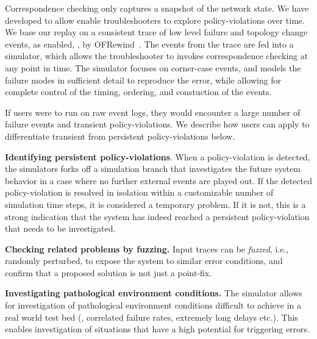 
Correspondence checking only captures a snapshot of the network state.
We have developed \simulator{} to allow enable troubleshooters to explore
policy-violations over time. We base our replay on a consistent
trace of low level failure and topology change events, as enabled,
\eg{}, by OFRewind~\cite{ofrewind}. The
events from the trace are fed into a simulator, which allows the
troubleshooter to invokes correspondence
checking at any point in time. The simulator focuses on corner-case events,
and models the failure modes in sufficient detail to reproduce the error, while
allowing for complete control of the timing, ordering, and constuction of the events.


If users were to run \simulator{} on raw event logs, they would encounter a
large number of failure events and transient policy-violations. We describe
how users can apply \simulator{} to differentiate transient from persistent
policy-violations below.

\textbf{Identifying persistent policy-violations}. When a policy-violation is detected,
the simulators forks off a simulation branch that investigates the future system behavior
in a case where no further external events are played out. If the detected
policy-violation
is resolved in isolation within a customizable number of simulation time steps, it is considered
a temporary problem. If it is not, this is a strong indication that the system has indeed
reached a persistent policy-violation that needs to be investigated.

\textbf{Checking related problems by fuzzing.} Input traces can be \emph{fuzzed}, i.e.,
randomly perturbed, to expose the system to similar error conditions, and confirm
that a proposed solution is not just a point-fix.

\textbf{Investigating pathological environment conditions.} The simulator allows for investigation
of pathological environment conditions difficult to achieve in a real world test bed
(\eg{}, correlated failure rates, extremely long delays etc.). This enables
investigation of situations that have a high potential for triggering errors.

